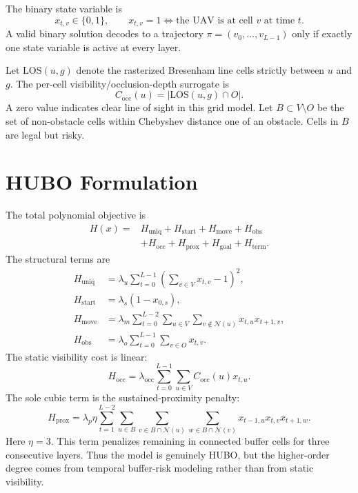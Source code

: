 \documentclass[10pt,conference]{IEEEtran}
\begin{document}
The binary state variable is
\begin{equation}
 x_{t,v}\in\{0,1\},\qquad x_{t,v}=1 \Leftrightarrow \text{the UAV is at cell }v\text{ at time }t.
\end{equation}
A valid binary solution decodes to a trajectory $\pi=(v_0,\ldots,v_{L-1})$ only if exactly one state variable is active at every layer.

Let $\mathrm{LOS}(u,g)$ denote the rasterized Bresenham line cells strictly between $u$ and $g$. The per-cell visibility/occlusion-depth surrogate is
\begin{equation}
 C_{\mathrm{occ}}(u)=|\mathrm{LOS}(u,g)\cap O|.
\end{equation}
A zero value indicates clear line of sight in this grid model. Let $B\subset V\setminus O$ be the set of non-obstacle cells within Chebyshev distance one of an obstacle. Cells in $B$ are legal but risky.

\section{HUBO Formulation}
The total polynomial objective is
\begin{equation}
\begin{split}
H(x) = &H_{\mathrm{uniq}} + H_{\mathrm{start}} + H_{\mathrm{move}} + H_{\mathrm{obs}} \\
&+ H_{\mathrm{occ}} + H_{\mathrm{prox}} + H_{\mathrm{goal}} + H_{\mathrm{term}} .
\end{split}
\end{equation}
The structural terms are
\begin{align}
H_{\mathrm{uniq}} &= \lambda_u \sum_{t=0}^{L-1}\left(\sum_{v\in V} x_{t,v}-1\right)^2,\\
H_{\mathrm{start}} &= \lambda_s(1-x_{0,s}),\\
H_{\mathrm{move}} &= \lambda_m\sum_{t=0}^{L-2}\sum_{u\in V}\sum_{v\notin\mathcal{N}(u)}x_{t,u}x_{t+1,v},\\
H_{\mathrm{obs}} &= \lambda_o\sum_{t=0}^{L-1}\sum_{v\in O}x_{t,v}.
\end{align}
The static visibility cost is linear:
\begin{equation}
H_{\mathrm{occ}}=\lambda_{\mathrm{occ}}\sum_{t=0}^{L-1}\sum_{u\in V}C_{\mathrm{occ}}(u)x_{t,u}.
\end{equation}
The sole cubic term is the sustained-proximity penalty:
\begin{equation}
H_{\mathrm{prox}}=\lambda_p \eta \sum_{t=1}^{L-2}\sum_{u\in B}\sum_{v\in B\cap\mathcal{N}(u)}\sum_{w\in B\cap\mathcal{N}(v)}x_{t-1,u}x_{t,v}x_{t+1,w}.
\end{equation}
Here $\eta=3$. This term penalizes remaining in connected buffer cells for three consecutive layers. Thus the model is genuinely HUBO, but the higher-order degree comes from temporal buffer-risk modeling rather than from static visibility.
\end{document}

